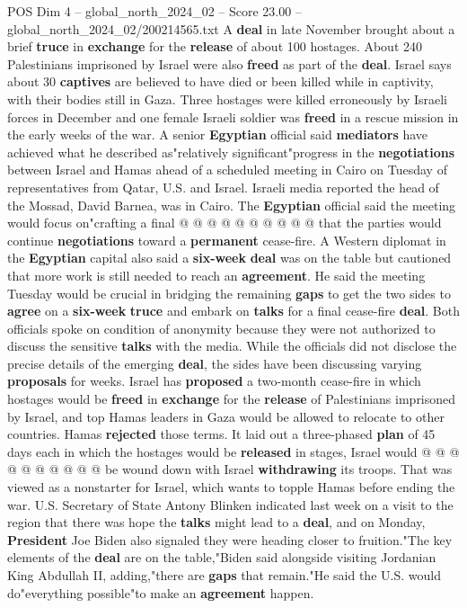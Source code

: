 \begin{textsample}{POS Dim 4 – global\_north\_2024\_02 – Score 23.00 – global\_north\_2024\_02/200214565.txt}
A \textbf{deal} in late November brought about a brief \textbf{truce} in \textbf{exchange} for the \textbf{release} of about 100 hostages.
About 240 Palestinians imprisoned by Israel were also \textbf{freed} as part of the \textbf{deal}.
Israel says about 30 \textbf{captives} are believed to have died or been killed while in captivity, with their bodies still in Gaza.
Three hostages were killed erroneously by Israeli forces in December and one female Israeli soldier was \textbf{freed} in a rescue mission in the early weeks of the war.
A senior \textbf{Egyptian} official said \textbf{mediators} have achieved what he described as"relatively significant"progress in the \textbf{negotiations} between Israel and Hamas ahead of a scheduled meeting in Cairo on Tuesday of representatives from Qatar, U.S. and Israel.
Israeli media reported the head of the Mossad, David Barnea, was in Cairo.
The \textbf{Egyptian} official said the meeting would focus on"crafting a final @ @ @ @ @ @ @ @ @ @ that the parties would continue \textbf{negotiations} toward a \textbf{permanent} cease-fire.
A Western diplomat in the \textbf{Egyptian} capital also said a \textbf{six-week} \textbf{deal} was on the table but cautioned that more work is still needed to reach an \textbf{agreement}.
He said the meeting Tuesday would be crucial in bridging the remaining \textbf{gaps} to get the two sides to \textbf{agree} on a \textbf{six-week} \textbf{truce} and embark on \textbf{talks} for a final cease-fire \textbf{deal}.
Both officials spoke on condition of anonymity because they were not authorized to discuss the sensitive \textbf{talks} with the media.
While the officials did not disclose the precise details of the emerging \textbf{deal}, the sides have been discussing varying \textbf{proposals} for weeks.
Israel has \textbf{proposed} a two-month cease-fire in which hostages would be \textbf{freed} in \textbf{exchange} for the \textbf{release} of Palestinians imprisoned by Israel, and top Hamas leaders in Gaza would be allowed to relocate to other countries.
Hamas \textbf{rejected} those terms.
It laid out a three-phased \textbf{plan} of 45 days each in which the hostages would be \textbf{released} in stages, Israel would @ @ @ @ @ @ @ @ @ @ be wound down with Israel \textbf{withdrawing} its troops.
That was viewed as a nonstarter for Israel, which wants to topple Hamas before ending the war.
U.S.
Secretary of State Antony Blinken indicated last week on a visit to the region that there was hope the \textbf{talks} might lead to a \textbf{deal}, and on Monday, \textbf{President} Joe Biden also signaled they were heading closer to fruition."The key elements of the \textbf{deal} are on the table,"Biden said alongside visiting Jordanian King Abdullah II, adding,"there are \textbf{gaps} that remain."He said the U.S. would do"everything possible"to make an \textbf{agreement} happen.

\end{textsample}
